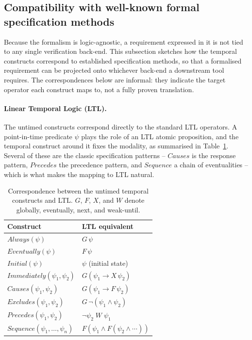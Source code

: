 \subsection{Compatibility with well-known formal specification methods}

Because the formalism is logic-agnostic, a requirement expressed in it is not tied to any single verification back-end. This subsection sketches how the temporal constructs correspond to established specification methods, so that a formalised requirement can be projected onto whichever back-end a downstream tool requires. The correspondences below are informal: they indicate the target operator each construct maps to, not a fully proven translation.

\paragraph{Linear Temporal Logic (LTL).}
The untimed constructs correspond directly to the standard LTL operators. A point-in-time predicate $\psi$ plays the role of an LTL atomic proposition, and the temporal construct around it fixes the modality, as summarised in Table~\ref{tab:ltl}. Several of these are the classic specification patterns -- $\mathit{Causes}$ is the response pattern, $\mathit{Precedes}$ the precedence pattern, and $\mathit{Sequence}$ a chain of eventualities -- which is what makes the mapping to LTL natural.

\begin{table}[h]
    \centering
    \caption{Correspondence between the untimed temporal constructs and LTL. $G$, $F$, $X$, and $W$ denote globally, eventually, next, and weak-until.}
    \label{tab:ltl}
    \footnotesize
    \begin{tabular}{@{}l l@{}}
        \toprule
        Construct                                   & LTL equivalent                           \\
        \midrule
        $\mathit{Always}(\psi)$                     & $G\,\psi$                                \\
        $\mathit{Eventually}(\psi)$                 & $F\,\psi$                                \\
        $\mathit{Initial}(\psi)$                    & $\psi$ (initial state)                   \\
        $\mathit{Immediately}(\psi_1, \psi_2)$      & $G(\psi_1 \rightarrow X\,\psi_2)$        \\
        $\mathit{Causes}(\psi_1, \psi_2)$           & $G(\psi_1 \rightarrow F\,\psi_2)$        \\
        $\mathit{Excludes}(\psi_1, \psi_2)$         & $G\,\lnot(\psi_1 \land \psi_2)$          \\
        $\mathit{Precedes}(\psi_1, \psi_2)$         & $\lnot \psi_2 \; W \; \psi_1$            \\
        $\mathit{Sequence}(\psi_1, \ldots, \psi_n)$ & $F(\psi_1 \land F(\psi_2 \land \cdots))$ \\
        \bottomrule
    \end{tabular}
\end{table}


